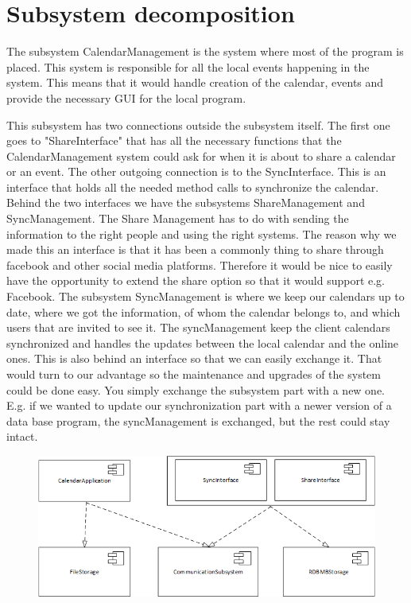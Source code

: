 \clearpage
\section*{Subsystem decomposition}
The subsystem CalendarManagement is the system where most of the program is placed. This system is responsible for all the local events happening in the system. This means that it would handle creation of the calendar, events and provide the necessary GUI for the local program. 

This subsystem has two connections outside the subsystem itself. The first one goes to "ShareInterface" that has all the necessary functions that the CalendarManagement system could ask for when it is about to share a calendar or an event. The other outgoing connection is to the SyncInterface. This is an interface that holds all the needed method calls to synchronize the calendar. Behind the two interfaces we have the subsystems ShareManagement and SyncManagement. 
\newline
\newline
The Share Management has to do with sending the information to the right people and using the right systems. The reason why we made this an interface is that it has been a commonly thing to share through facebook and other social media platforms. Therefore it would be nice to easily have the opportunity to extend the share option so that it would support e.g. Facebook. 
\newline
\newline
The subsystem SyncManagement is where we keep our calendars up to date, where we got the information, of whom the calendar belongs to, and which users that are invited to see it. The syncManagement keep the client calendars synchronized and handles the updates between the local calendar and the online ones. This is also behind an interface so that we can easily exchange it. That would turn to our advantage so the maintenance and upgrades of the system could be done easy. You simply exchange the subsystem part with a new one. E.g. if we wanted to update our synchronization part with a newer version of a data base program, the syncManagement is exchanged, but the rest could stay intact. 
\newline
\begin{figure}[ht!]
\centering
\includegraphics[width=135mm]{UMLComponentData.png}
\end{figure}


